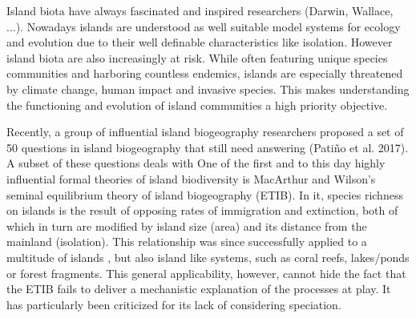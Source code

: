 \documentclass[a4paper]{scrartcl}
\begin{document}



Island biota have always fascinated and inspired researchers (Darwin, Wallace, ...). %
Nowadays islands are understood as well suitable model systems for ecology and evolution due to their well definable characteristics like isolation. %
However island biota are also increasingly at risk.
While often featuring unique species communities and harboring countless endemics, %
islands are especially threatened by climate change, human impact and invasive species. %
This makes understanding the functioning and evolution of island communities a high priority objective.

Recently, a group of influential island biogeography researchers proposed a set of 50 questions in island biogeography that still need answering (Patiño et al. 2017).
A subset of these questions deals with 
One of the first and to this day highly influential formal theories of island biodiversity is MacArthur and Wilson's seminal equilibrium theory of island biogeography (ETIB). %
In it, species richness on islands is the result of opposing rates of immigration and extinction, both of which in turn are modified by island size (area) and its distance from the mainland (isolation).
This relationship was since successfully applied to a multitude of islands %
, but also island like systems, such as coral reefs, lakes/ponds or forest fragments. %
This general applicability, however, cannot hide the fact that the ETIB fails to deliver a mechanistic explanation of the processes at play.
It has particularly been criticized for its lack of considering speciation. %
\end{document}
